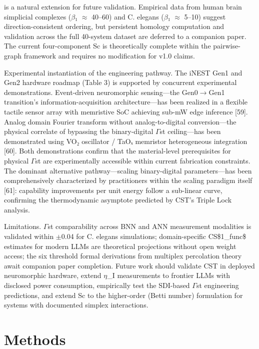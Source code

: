 \documentclass[a4paper,12pt]{article}
\begin{document}
is a natural extension for future validation. Empirical data from human brain simplicial complexes ($\beta$₁ $\approx$ 40--60) and C. elegans ($\beta$₁ $\approx$ 5--10) suggest direction-consistent ordering, but persistent homology computation and validation across the full 40-system dataset are deferred to a companion paper. The current four-component Sc is theoretically complete within the pairwise-graph framework and requires no modification for v1.0 claims.


Experimental instantiation of the engineering pathway. The iNEST Gen1 and Gen2 hardware roadmap (Table 3) is supported by concurrent experimental demonstrations. Event-driven neuromorphic sensing---the Gen0$\rightarrow$Gen1 transition's information-acquisition architecture---has been realized in a flexible tactile sensor array with memristive SoC achieving sub-mW edge inference [59]. Analog domain Fourier transform without analog-to-digital conversion---the physical correlate of bypassing the binary-digital $\Gamma$st ceiling---has been demonstrated using VO₂ oscillator / TaOₓ memristor heterogeneous integration [60]. Both demonstrations confirm that the material-level prerequisites for physical $\Gamma$st are experimentally accessible within current fabrication constraints. The dominant alternative pathway---scaling binary-digital parameters---has been comprehensively characterized by practitioners within the scaling paradigm itself [61]: capability improvements per unit energy follow a sub-linear curve, confirming the thermodynamic asymptote predicted by CST's Triple Lock analysis.


Limitations. $\Gamma$st comparability across BNN and ANN measurement modalities is validated within $\pm$0.04 for C. elegans simulations; domain-specific CS\$1_{func}\$ estimates for modern LLMs are theoretical projections without open weight access; the six threshold formal derivations from multiplex percolation theory await companion paper completion. Future work should validate CST in deployed neuromorphic hardware, extend $\eta$_I measurements to frontier LLMs with disclosed power consumption, empirically test the SDI-based $\Gamma$st engineering predictions, and extend Sc to the higher-order (Betti number) formulation for systems with documented simplex interactions.



\section{Methods}
\end{document}
